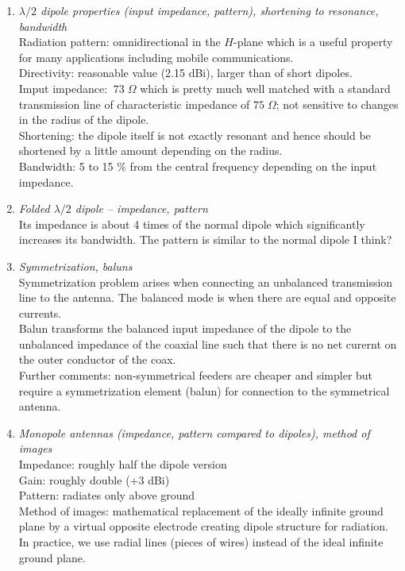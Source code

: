 \documentclass[11pt,a4paper]{article}
\begin{document}
\begin{enumerate}
    \item \emph{$\lambda/2$ dipole properties (input impedance, pattern), shortening to resonance, bandwidth}\\
    Radiation pattern: omnidirectional in the $H$-plane which is a useful property for many applications including mobile communications.\\
    Directivity: reasonable value (2.15 dBi), larger than of short dipoles.\\
    Imput impedance: $~73 \; \Omega$ which is pretty much well matched with a standard transmission line of characteristic impedance of $75 \; \Omega$; not sensitive to changes in the radius of the dipole.\\
    Shortening: the dipole itself is not exactly resonant and hence should be shortened by a little amount depending on the radius.\\
    Bandwidth: 5 to 15 \% from the central frequency depending on the input impedance.

    \item \emph{Folded $\lambda/2$ dipole -- impedance, pattern}\\
    Its impedance is about 4 times of the normal dipole which significantly increases its bandwidth. The pattern is similar to the normal dipole I think?

    \item \emph{Symmetrization, baluns}\\
    Symmetrization problem arises when connecting an unbalanced transmission line to the antenna. The balanced mode is when there are equal and opposite currents.\\
    Balun transforms the balanced input impedance of the dipole to the unbalanced impedance of the coaxial line such that there is no net curernt on the outer conductor of the coax.\\
    Further comments: non-symmetrical feeders are cheaper and simpler but require a symmetrization element (balun) for connection to the symmetrical antenna.

    \item \emph{Monopole antennas (impedance, pattern compared to dipoles), method of images}\\
    Impedance: roughly half the dipole version\\
    Gain: roughly double (+3 dBi)\\
    Pattern: radiates only above ground\\
    Method of images: mathematical replacement of the ideally infinite ground plane by a virtual opposite electrode creating dipole structure for radiation. In practice, we use radial lines (pieces of wires) instead of the ideal infinite ground plane.


\end{enumerate}
\end{document}
